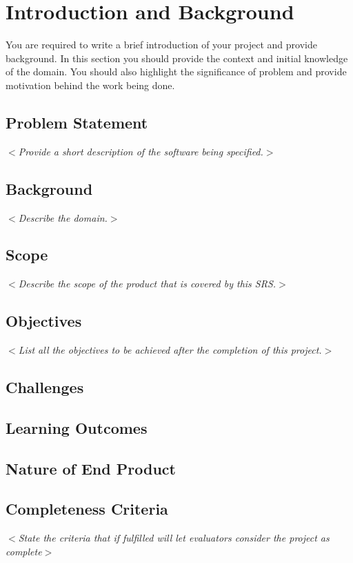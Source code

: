 
\section{Introduction and Background}

You are required to write a brief introduction of your project and provide background. In this section you should provide the context and initial knowledge of the domain. You should also highlight the significance of problem and provide motivation behind the work being done.

\subsection{Problem Statement}
\textit{$<$Provide a short description of the software being specified.$>$}

\subsection{Background}
\textit{$<$Describe the domain.$>$}

\subsection{Scope}
\textit{$<$Describe the scope of the product that is covered by this SRS.$>$}

\subsection{Objectives}

\textit{$<$List all the objectives to be achieved after the completion of this project.$>$}

\subsection{Challenges}
\subsection{Learning Outcomes}
\subsection{Nature of End Product}
\subsection{Completeness Criteria}
\textit{$<$State the criteria that if fulfilled will let evaluators consider the project as complete$>$}
